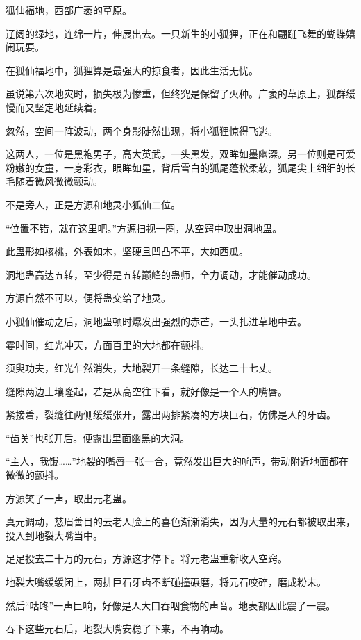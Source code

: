 
\begin{this_body}

狐仙福地，西部广袤的草原。

辽阔的绿地，连绵一片，伸展出去。一只新生的小狐狸，正在和翩跹飞舞的蝴蝶嬉闹玩耍。

在狐仙福地中，狐狸算是最强大的掠食者，因此生活无忧。

虽说第六次地灾时，损失极为惨重，但终究是保留了火种。广袤的草原上，狐群缓慢而又坚定地延续着。

忽然，空间一阵波动，两个身影陡然出现，将小狐狸惊得飞逃。

这两人，一位是黑袍男子，高大英武，一头黑发，双眸如墨幽深。另一位则是可爱粉嫩的女童，一身彩衣，眼眸如星，背后雪白的狐尾蓬松柔软，狐尾尖上细细的长毛随着微风微微颤动。

不是旁人，正是方源和地灵小狐仙二位。

“位置不错，就在这里吧。”方源扫视一圈，从空窍中取出洞地蛊。

此蛊形如核桃，外表如木，坚硬且凹凸不平，大如西瓜。

洞地蛊高达五转，至少得是五转巅峰的蛊师，全力调动，才能催动成功。

方源自然不可以，便将蛊交给了地灵。

小狐仙催动之后，洞地蛊顿时爆发出强烈的赤芒，一头扎进草地中去。

霎时间，红光冲天，方面百里的大地都在颤抖。

须臾功夫，红光乍然消失，大地裂开一条缝隙，长达二十七丈。

缝隙两边土壤隆起，若是从高空往下看，就好像是一个人的嘴唇。

紧接着，裂缝往两侧缓缓张开，露出两排紧凑的方块巨石，仿佛是人的牙齿。

“齿关”也张开后。便露出里面幽黑的大洞。

“主人，我饿……”地裂的嘴唇一张一合，竟然发出巨大的响声，带动附近地面都在微微的颤抖。

方源笑了一声，取出元老蛊。

真元调动，慈眉善目的云老人脸上的喜色渐渐消失，因为大量的元石都被取出来，投入到地裂大嘴当中。

足足投去二十万的元石，方源这才停下。将元老蛊重新收入空窍。

地裂大嘴缓缓闭上，两排巨石牙齿不断碰撞碾磨，将元石咬碎，磨成粉末。

然后“咕咚”一声巨响，好像是人大口吞咽食物的声音。地表都因此震了一震。

吞下这些元石后，地裂大嘴安稳了下来，不再响动。


\end{this_body}
